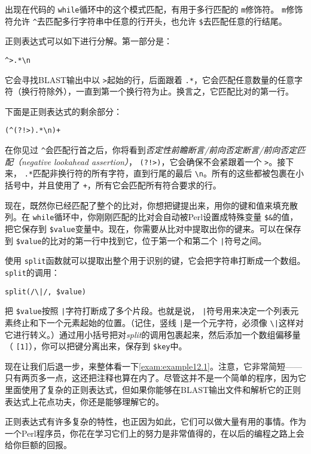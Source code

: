 出现在代码的 \verb|while|循环中的这个模式匹配，有用于多行匹配的 \verb|m|修饰符。 \verb|m|修饰符允许 \verb|^|去匹配多行字符串中任意的行开头，也允许 \verb|$|去匹配任意的行结尾。

正则表达式可以如下进行分解。第一部分是：

\begin{lstlisting}
^>.*\n
\end{lstlisting}

它会寻找BLAST输出中以 \verb|>|起始的行，后面跟着 \verb|.*|，它会匹配任意数量的任意字符（换行符除外），一直到第一个换行符为止。换言之，它匹配比对的第一行。

下面是正则表达式的剩余部分：

\begin{lstlisting}
(^(?!>).*\n)+
\end{lstlisting}

在你见过 \verb|^|会匹配行首之后，你将看到\textit{否定性前瞻断言/前向否定断言/前向否定匹配（negative lookahead assertion）}， \verb|(?!>)|，它会确保不会紧跟着一个 \verb|>|。接下来， \verb|.*|匹配非换行符的所有字符，直到行尾的最后 \verb|\n|。所有的这些都被包裹在小括号中，并且使用了 \verb|+|，所有它会匹配所有符合要求的行。

现在，既然你已经匹配了整个的比对，你想把键提出来，用你的键和值来填充散列。在 \verb|while|循环中，你刚刚匹配的比对会自动被Perl设置成特殊变量 \verb|$&|的值，把它保存到 \verb|$value|变量中。现在，你需要从比对中提取出你的键来。可以在保存到 \verb|$value|的比对的第一行中找到它，位于第一个和第二个 \verb=|=符号之间。

使用 \verb|split|函数就可以提取出整个用于识别的键，它会把字符串打断成一个数组。 \verb|split|的调用：

\begin{lstlisting}
split(/\|/, $value)
\end{lstlisting}

把 \verb|$value|按照 \verb=|=字符打断成了多个片段。也就是说， \verb=|=符号用来决定一个列表元素终止和下一个元素起始的位置。（记住，竖线 \verb=|=是一个元字符，必须像 \verb=\|=这样对它进行转义。）通过用小括号把对\textit{split}的调用包裹起来，然后添加一个数组偏移量（ \verb|[1]|），你可以把键分离出来，保存到 \verb|$key|中。

现在让我们后退一步，来整体看一下\autoref{exam:example12.1}。注意，它非常简短——只有两页多一点，这还把注释也算在内了。尽管这并不是一个简单的程序，因为它里面使用了复杂的正则表达式，但如果你能够在BLAST输出文件和解析它的正则表达式上花点功夫，你还是能够理解它的。

正则表达式有许多复杂的特性，也正因为如此，它们可以做大量有用的事情。作为一个Perl程序员，你花在学习它们上的努力是非常值得的，在以后的编程之路上会给你巨额的回报。

